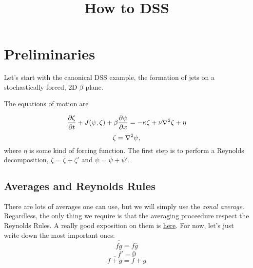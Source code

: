 \documentclass{paper}
\title{How to DSS}
\newcommand*{\mean}[1]{\overline{#1}}
\begin{document}
\maketitle

\section{Preliminaries}
\label{sec:preliminaries}

Let's start with the canonical DSS example, the formation of jets on a stochastically forced, 2D $\beta$ plane.

The equations of motion are

\begin{equation}
  \label{eq:zeta_eom}
  \pdv{\zeta}{t} + J(\psi, \zeta) + \beta \pdv{\psi}{x} = -\kappa \zeta + \nu \laplacian{\zeta} + \eta
\end{equation}
%
\begin{equation}
  \label{eq:zeta_def}
  \zeta = \laplacian{\psi},
\end{equation}
where $\eta$ is some kind of forcing function. The first step is to perform a Reynolds decomposition, $\zeta = \mean{\zeta} + \zeta'$ and $\psi = \mean{\psi} + \psi'$.

\subsection{Averages and Reynolds Rules}
\label{sec:averages}

There are lots of averages one can use, but we will simply use the \emph{zonal average}. Regardless, the only thing we require is that the averaging proceedure respect the Reynolds Rules. A really good exposition on them is \href{https://kiwi.atmos.colostate.edu/group/dave/pdf/Reynolds_Averaging.pdf}{here}. For now, let's just write down the most important ones:
\begin{equation}
  \label{eq:reyn_1}
  \mean{\mean{f} g} = \mean{f}\mean{g}
\end{equation}
\begin{equation}
  \label{eq:reyn_2}
  \mean{f'} = 0
\end{equation}
\begin{equation}
  \label{eq:reyn_3}
  \mean{f + g} = \mean{f} + \mean{g}
\end{equation}
\end{document}
